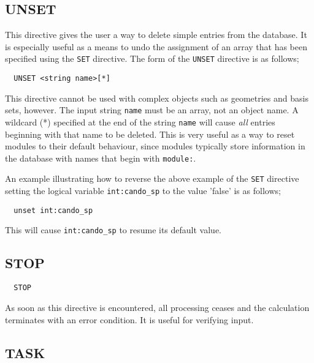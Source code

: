 \subsection{UNSET}
\label{sec:unset}

This directive gives the user a way to delete simple entries from the
database.  It is especially useful as a  means to undo the assignment 
of an array that has been specified using the \verb+SET+ directive.  
The form of the \verb+UNSET+ directive is as follows;

\begin{verbatim}
  UNSET <string name>[*]
\end{verbatim}

This directive cannot be used with complex objects such as geometries and
basis sets, however.  The input string \verb+name+ must be an array, not
an object name. A wildcard (*) specified at the end of the 
string \verb+name+ will cause {\em all}
entries beginning with that name to be deleted.  This is very useful as a
way to reset modules to their default behaviour, since modules typically store
information in the database with names that begin with
\verb+module:+.

An example illustrating how to reverse the above example of the
\verb+SET+ directive setting the logical variable \verb+int:cando_sp+ 
to the value 'false' is as follows;

\begin{verbatim}
  unset int:cando_sp
\end{verbatim}

This will cause \verb+int:cando_sp+ to resume its default value.

\subsection{STOP}

\begin{verbatim}
  STOP
\end{verbatim}

As soon as this directive is encountered, all processing ceases and
the calculation terminates with an error condition.  It is useful for
verifying input.

\subsection{TASK}
\label{sec:task}

